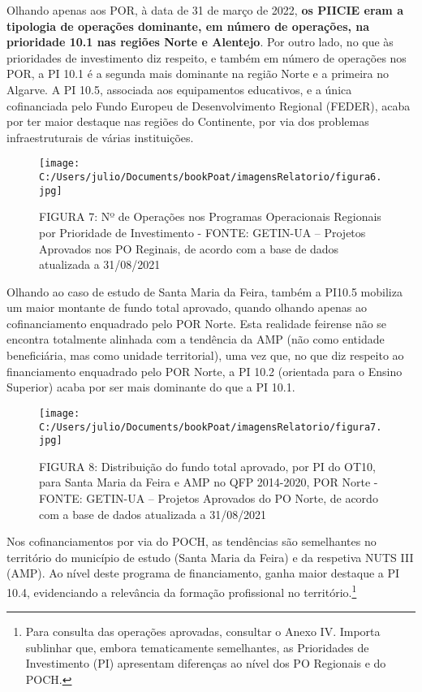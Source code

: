 \documentclass[
]{book}
\begin{document}
Olhando apenas aos POR, à data de 31 de março de 2022, \textbf{os PIICIE eram a tipologia de operações dominante, em número de operações, na prioridade 10.1 nas regiões Norte e Alentejo}. Por outro lado, no que às prioridades de investimento diz respeito, e também em número de operações nos POR, a PI 10.1 é a segunda mais dominante na região Norte e a primeira no Algarve. A PI 10.5, associada aos equipamentos educativos, e a única cofinanciada pelo Fundo Europeu de Desenvolvimento Regional (FEDER), acaba por ter maior destaque nas regiões do Continente, por via dos problemas infraestruturais de várias instituições.

\begin{figure}
\centering
\texttt{[image: C:/Users/julio/Documents/bookPoat/imagensRelatorio/figura6.jpg]}
\caption{FIGURA 7: Nº de Operações nos Programas Operacionais Regionais por Prioridade de Investimento - FONTE: GETIN-UA -- Projetos Aprovados nos PO Reginais, de acordo com a base de dados atualizada a 31/08/2021}
\end{figure}

Olhando ao caso de estudo de Santa Maria da Feira, também a PI10.5 mobiliza um maior montante de fundo total aprovado, quando olhando apenas ao cofinanciamento enquadrado pelo POR Norte. Esta realidade feirense não se encontra totalmente alinhada com a tendência da AMP (não como entidade beneficiária, mas como unidade territorial), uma vez que, no que diz respeito ao financiamento enquadrado pelo POR Norte, a PI 10.2 (orientada para o Ensino Superior) acaba por ser mais dominante do que a PI 10.1.

\begin{figure}
\centering
\texttt{[image: C:/Users/julio/Documents/bookPoat/imagensRelatorio/figura7.jpg]}
\caption{FIGURA 8: Distribuição do fundo total aprovado, por PI do OT10, para Santa Maria da Feira e AMP no QFP 2014-2020, POR Norte - FONTE: GETIN-UA -- Projetos Aprovados do PO Norte, de acordo com a base de dados atualizada a 31/08/2021}
\end{figure}

Nos cofinanciamentos por via do POCH, as tendências são semelhantes no território do município de estudo (Santa Maria da Feira) e da respetiva NUTS III (AMP). Ao nível deste programa de financiamento, ganha maior destaque a PI 10.4, evidenciando a relevância da formação profissional no território.\footnote{Para consulta das operações aprovadas, consultar o Anexo IV.
  Importa sublinhar que, embora tematicamente semelhantes, as Prioridades de Investimento (PI) apresentam diferenças ao nível dos PO Regionais e do POCH.}
\end{document}
